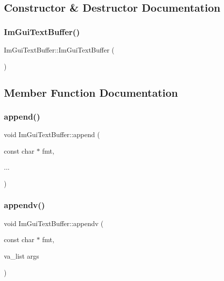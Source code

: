 \subsection{Constructor \& Destructor Documentation}
\hypertarget{struct_im_gui_text_buffer_a4c4369c5e65f591554428b947c498d0d}{}\label{struct_im_gui_text_buffer_a4c4369c5e65f591554428b947c498d0d} 
\subsubsection{\texorpdfstring{Im\+Gui\+Text\+Buffer()}{ImGuiTextBuffer()}}
{\footnotesize\ttfamily Im\+Gui\+Text\+Buffer\+::\+Im\+Gui\+Text\+Buffer (\begin{DoxyParamCaption}{ }\end{DoxyParamCaption})}



\subsection{Member Function Documentation}
\hypertarget{struct_im_gui_text_buffer_a791ac3e5638c58b53772e14bee1323db}{}\label{struct_im_gui_text_buffer_a791ac3e5638c58b53772e14bee1323db} 
\subsubsection{\texorpdfstring{append()}{append()}}
{\footnotesize\ttfamily void Im\+Gui\+Text\+Buffer\+::append (\begin{DoxyParamCaption}\item[{const char $\ast$}]{fmt,  }\item[{}]{... }\end{DoxyParamCaption})}

\hypertarget{struct_im_gui_text_buffer_ad7c7e0d7ec1a12dd2a96a3dbb204deaf}{}\label{struct_im_gui_text_buffer_ad7c7e0d7ec1a12dd2a96a3dbb204deaf} 
\subsubsection{\texorpdfstring{appendv()}{appendv()}}
{\footnotesize\ttfamily void Im\+Gui\+Text\+Buffer\+::appendv (\begin{DoxyParamCaption}\item[{const char $\ast$}]{fmt,  }\item[{va\+\_\+list}]{args }\end{DoxyParamCaption})}

